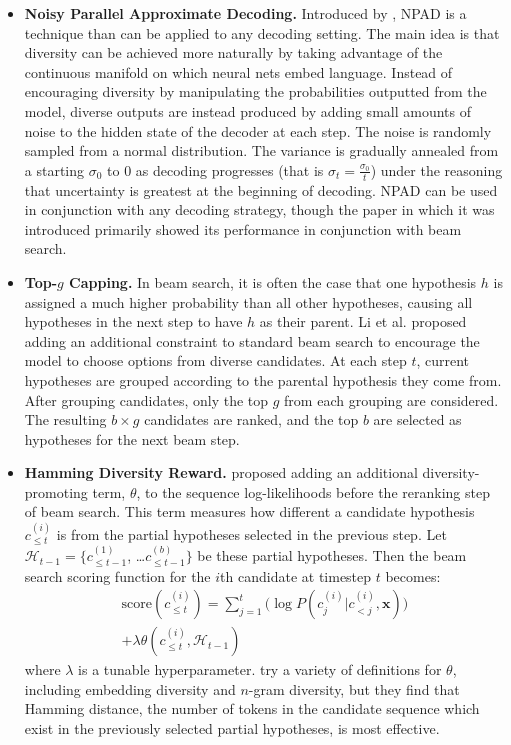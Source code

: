 \begin{itemize} 
\item \textbf{Noisy Parallel Approximate Decoding.}\quad
Introduced by \citet{cho2016noisy}, NPAD is a technique than can be applied to any decoding setting.
The main idea is that diversity can be achieved more naturally by taking advantage of the continuous manifold on which neural nets embed language.
Instead of encouraging diversity by manipulating the probabilities outputted from the model, diverse outputs are instead produced by adding small amounts of noise to the hidden state of the decoder at each step.
The noise is randomly sampled from a normal distribution. The variance is gradually annealed from a starting $\sigma_0$ to 0 as decoding progresses (that is $\sigma_t = \frac{\sigma_0}{t}$) under the reasoning that uncertainty is greatest at the beginning of decoding.
NPAD can be used in conjunction with any decoding strategy, though the paper in which it was introduced primarily showed its performance in conjunction with beam search.

\item \textbf{Top-$g$ Capping.}\quad
In beam search, it is often the case that one hypothesis $h$ is assigned a much higher probability than all other hypotheses, causing all hypotheses in the next step to have $h$ as their parent. Li et al. \citep{li2016mutual, li2016simple} proposed adding an additional constraint to standard beam search to encourage the model to choose options from diverse candidates.
At each step $t$, current hypotheses are grouped according to the parental hypothesis they come from.
After grouping candidates, only the top $g$ from each grouping are considered. The resulting $b \times g$ candidates are ranked, and the top $b$ are selected as hypotheses for the next beam step.

\item \textbf{Hamming Diversity Reward.}\quad
\citet{vijayakumar2016diverse} proposed adding an additional diversity-promoting term, $\theta$, to the sequence log-likelihoods before the reranking step of beam search.
This term measures how different a candidate hypothesis $c^{(i)}_{\leq t}$ is from the partial hypotheses selected in the previous step. Let $\mathcal{H}_{t-1} = \{c^{(1)}_{\leq t-1}$, \ldots $c^{(b)}_{\leq t-1}\}$ be these partial hypotheses.
Then the beam search scoring function for the $i$th candidate at timestep $t$ becomes:
\begin{align*}
    \text{score}(c^{(i)}_{\leq t}) = \sum_{j=1}^t \big(\log P(c^{(i)}_j | c^{(i)}_{<j}, \textbf{x})\big) \\+ \lambda\theta(c^{(i)}_{\leq t}, \mathcal{H}_{t-1})
\end{align*}
where $\lambda$ is a tunable hyperparameter. \citet{vijayakumar2016diverse} try a variety of definitions for $\theta$, including embedding diversity and $n$-gram diversity, but they find that Hamming distance, the number of tokens in the candidate sequence which exist in the previously selected partial hypotheses, is most effective. 


\end{itemize}
